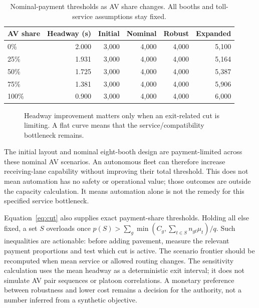 \documentclass[12pt,letterpaper]{article}
\begin{document}
\begin{table}[H]\centering\small\caption{Nominal-payment thresholds as AV share changes. All booths and toll-service assumptions stay fixed.}\begin{tabular}{@{}lrrrrr@{}}\toprule
AV share & Headway (s) & Initial & Nominal & Robust & Expanded\\\midrule
0\% & 2.000 & 3,000 & 4,000 & 4,000 & 5,100\\
25\% & 1.931 & 3,000 & 4,000 & 4,000 & 5,164\\
50\% & 1.725 & 3,000 & 4,000 & 4,000 & 5,387\\
75\% & 1.381 & 3,000 & 4,000 & 4,000 & 5,906\\
100\% & 0.900 & 3,000 & 4,000 & 4,000 & 6,000\\
\bottomrule\end{tabular}\end{table}
\begin{figure}[htbp]\centering{}\caption{Headway improvement matters only when an exit-related cut is limiting. A flat curve means that the service/compatibility bottleneck remains.}\label{fig:av}\end{figure}
The initial layout and nominal eight-booth design are payment-limited across these nominal AV scenarios. An autonomous fleet can therefore increase receiving-lane capability without improving their total threshold. This does not mean automation has no safety or operational value; those outcomes are outside the capacity calculation. It means automation alone is not the remedy for this specified service bottleneck.

Equation~\eqref{eq:cut} also supplies exact payment-share thresholds. Holding all else fixed, a set $S$ overloads once $p(S)>\sum_g\min(C_g,\sum_{t\in S}n_{gt}\mu_t)/q$. Such inequalities are actionable: before adding pavement, measure the relevant payment proportions and test which cut is active. The scenario frontier should be recomputed when mean service or allowed routing changes. The sensitivity calculation uses the mean headway as a deterministic exit interval; it does not simulate AV pair sequences or platoon correlations. A monetary preference between robustness and lower cost remains a decision for the authority, not a number inferred from a synthetic objective.
\end{document}

